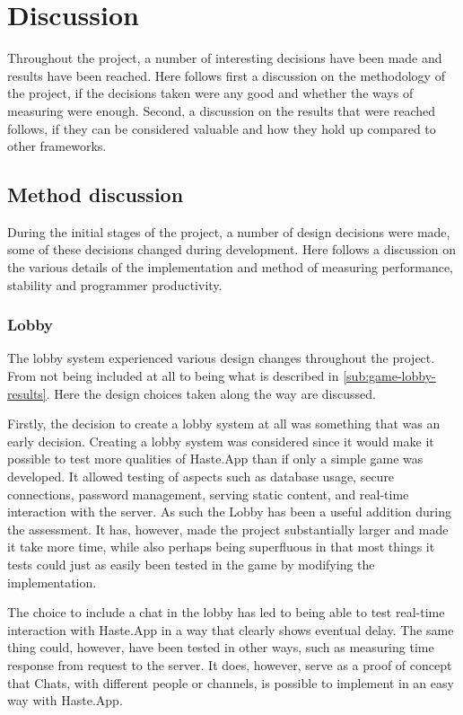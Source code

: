 \documentclass[a4paper]{article}
\begin{document}
\section{Discussion}
Throughout the project, a number of interesting decisions have been made and results have been reached. Here follows first a discussion on the methodology of the project, if the decisions taken were any good and whether the ways of measuring were enough. Second, a discussion on the results that were reached follows, if they can be considered valuable and how they hold up compared to other frameworks.


\subsection{Method discussion}
During the initial stages of the project, a number of design decisions were made, some of these decisions changed during development. Here follows a discussion on the various details of the implementation and method of measuring performance, stability and programmer productivity.

\subsubsection{Lobby}
The lobby system experienced various design changes throughout the project. From not being included at all to being what is described in \cref{sub:game-lobby-results}. Here the design choices taken along the way are discussed.

Firstly, the decision to create a lobby system at all was something that was an early decision. Creating a lobby system was considered since it would make it possible to test more  qualities of Haste.App than if only a simple game was developed. It allowed testing of aspects such as database usage, secure connections, password management, serving static content, and real-time interaction with the server. As such the Lobby has been a useful addition during the assessment. It has, however, made the project substantially larger and made it take more time, while also perhaps being superfluous in that most things it tests could just as easily been tested in the game by modifying the implementation.

The choice to include a chat in the lobby has led to being able to test real-time interaction with Haste.App in a way that clearly shows eventual delay. The same thing could, however, have been tested in other ways, such as measuring time response from request to the server. It does, however, serve as a proof of concept that Chats, with different people or channels, is possible to implement in an easy way with Haste.App.
\end{document}
